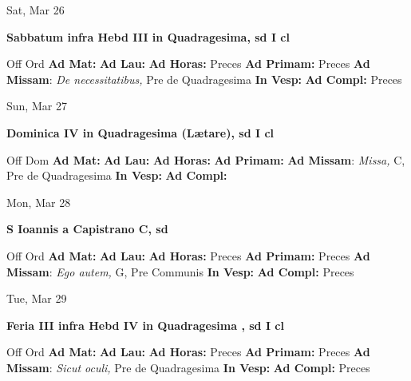 \documentclass[10pt]{article}
\begin{document}
\begin{minipage}{3.5in}
\vspace{2em}\begin{center}
Sat, Mar 26
\end{center}\textbf{ \large Sabbatum infra Hebd III in Quadragesima, \textnormal{\normalsize sd I cl}}
\begin{justify}
Off Ord
\textbf{Ad Mat: }
\textbf{Ad Lau: }
\textbf{Ad Horas: }Preces
\textbf{Ad Primam: }Preces
\textbf{Ad Missam}: \textit{De necessitatibus,} Pre de Quadragesima
\textbf{In Vesp: }
\textbf{Ad Compl: }Preces\end{justify}
\end{minipage}



\begin{minipage}{3.5in}
\vspace{2em}\begin{center}
Sun, Mar 27
\end{center}\textbf{ \large Dominica IV in Quadragesima (Lætare), \textnormal{\normalsize sd I cl}}
\begin{justify}
Off Dom
\textbf{Ad Mat: }
\textbf{Ad Lau: }
\textbf{Ad Horas: }
\textbf{Ad Primam: }
\textbf{Ad Missam}: \textit{Missa,} C, Pre de Quadragesima
\textbf{In Vesp: }
\textbf{Ad Compl: }\end{justify}
\end{minipage}



\begin{minipage}{3.5in}
\vspace{2em}\begin{center}
Mon, Mar 28
\end{center}\textbf{ \large S Ioannis a Capistrano C, \textnormal{\normalsize sd}}
\begin{justify}
Off Ord
\textbf{Ad Mat: }
\textbf{Ad Lau: }
\textbf{Ad Horas: }Preces
\textbf{Ad Primam: }Preces
\textbf{Ad Missam}: \textit{Ego autem,} G, Pre Communis
\textbf{In Vesp: }
\textbf{Ad Compl: }Preces\end{justify}
\end{minipage}



\begin{minipage}{3.5in}
\vspace{2em}\begin{center}
Tue, Mar 29
\end{center}\textbf{ \large Feria III infra Hebd IV in Quadragesima , \textnormal{\normalsize sd I cl}}
\begin{justify}
Off Ord
\textbf{Ad Mat: }
\textbf{Ad Lau: }
\textbf{Ad Horas: }Preces
\textbf{Ad Primam: }Preces
\textbf{Ad Missam}: \textit{Sicut oculi,} Pre de Quadragesima
\textbf{In Vesp: }
\textbf{Ad Compl: }Preces\end{justify}
\end{minipage}
\end{document}
